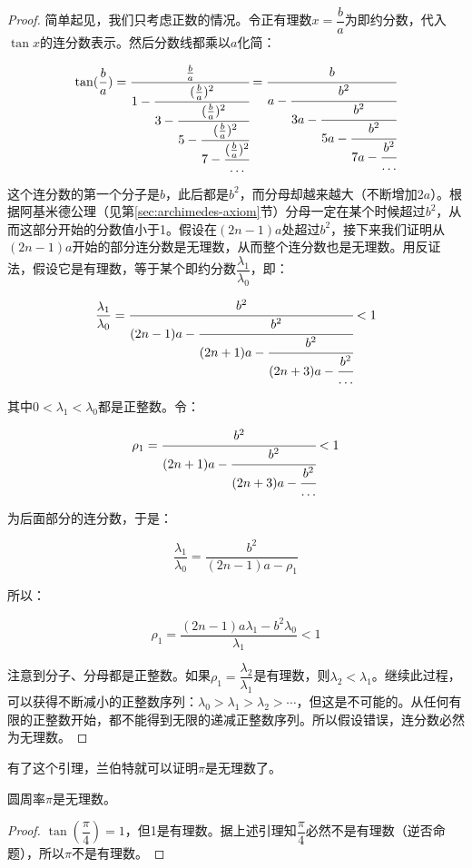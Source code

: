 \documentclass[b5paper]{ctexart}
\begin{document}
\begin{proof}
简单起见，我们只考虑正数的情况。令正有理数$x = \dfrac{b}{a}$为即约分数，代入$\tan x$的连分数表示。然后分数线都乘以$a$化简：

\[
\tan(\frac{b}{a}) = \cfrac{\frac{b}{a}}{1 - \cfrac{(\frac{b}{a})^2}{3 - \cfrac{(\frac{b}{a})^2}{5 - \cfrac{(\frac{b}{a})^2}{7 - \cfrac{(\frac{b}{a})^2}{\dotso}}}}} =
\cfrac{b}{a - \cfrac{b^2}{3a - \cfrac{b^2}{5a - \cfrac{b^2}{7a - \cfrac{b^2}{\dotso}}}}}
\]

这个连分数的第一个分子是$b$，此后都是$b^2$，而分母却越来越大（不断增加$2a$）。根据阿基米德公理（见第\ref{sec:archimedes-axiom}节）分母一定在某个时候超过$b^2$，从而这部分开始的分数值小于1。假设在$(2n - 1)a$处超过$b^2$，接下来我们证明从$(2n - 1)a$开始的部分连分数是无理数，从而整个连分数也是无理数。用反证法，假设它是有理数，等于某个即约分数$\dfrac{\lambda_1}{\lambda_0}$，即：

\[
\frac{\lambda_1}{\lambda_0} = \cfrac{b^2}{(2n - 1)a - \cfrac{b^2}{(2n + 1)a - \cfrac{b^2}{(2n + 3)a - \cfrac{b^2}{\dotso}}}} < 1
\]

其中$0 < \lambda_1 < \lambda_0$都是正整数。令：

\[
\rho_1 = \cfrac{b^2}{(2n + 1)a - \cfrac{b^2}{(2n + 3)a - \cfrac{b^2}{\dotso}}} < 1
\]

为后面部分的连分数，于是：

\[
\frac{\lambda_1}{\lambda_0} = \frac{b^2}{(2n - 1)a - \rho_1}
\]

所以：

\[
\rho_1 = \frac{(2n - 1)a\lambda_1 - b^2\lambda_0}{\lambda_1} < 1
\]

注意到分子、分母都是正整数。如果$\rho_1 = \dfrac{\lambda_2}{\lambda_1}$是有理数，则$\lambda_2 < \lambda_1$。继续此过程，可以获得不断减小的正整数序列：$\lambda_0 > \lambda_1 > \lambda_2 > \dotsb$，但这是不可能的。从任何有限的正整数开始，都不能得到无限的递减正整数序列。所以假设错误，连分数必然为无理数。
\end{proof}

有了这个引理，兰伯特就可以证明$\pi$是无理数了。

\begin{theorem}[兰伯特]
圆周率$\pi$是无理数。
\end{theorem}

\begin{proof}
$\tan(\dfrac{\pi}{4}) = 1$，但1是有理数。据上述引理知$\dfrac{\pi}{4}$必然不是有理数（逆否命题），所以$\pi$不是有理数。
\end{proof}
\end{document}
